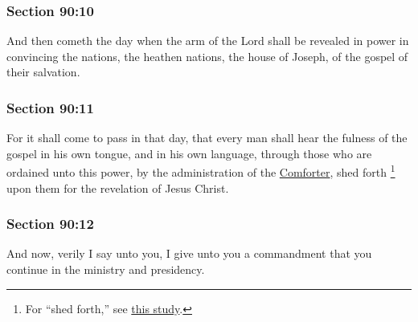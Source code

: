 	\subsubsection{Section 90:10} %
		\label{DC90-10}

		And then cometh the day when the arm of the Lord shall be revealed in power in convincing the nations, the heathen nations, the house of Joseph, of the gospel of their salvation.


	\subsubsection{Section 90:11} %
		\label{DC90-11}

		For it shall come to pass in that day, that every man shall hear the fulness of the gospel in his own tongue, and in his own language, through those who are ordained unto this power, by the administration of the \hyperref[COMFORTER]{Comforter}, shed forth%
			\footnote{%
				For ``shed forth,'' see \hyperref[SHED-abroad]{this study}.
				}
		upon them for the revelation of Jesus Christ.			


	\subsubsection{Section 90:12} %
		\label{DC90-12}

		And now, verily I say unto you, I give unto you a commandment that you continue in the ministry and presidency.

